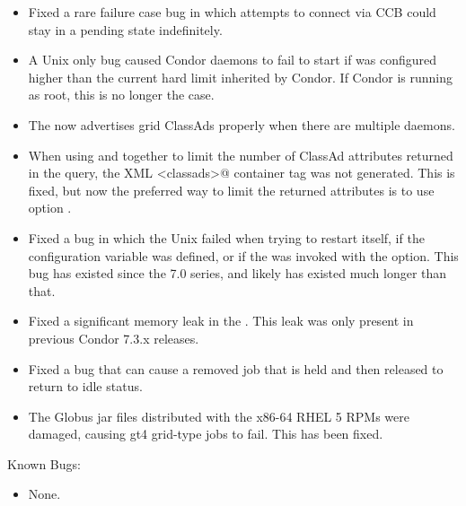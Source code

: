 \begin{itemize}
\item Fixed a rare failure case bug in which attempts to connect via
CCB could stay in a pending state indefinitely.

\item A Unix only bug caused Condor daemons to fail to start if
 was configured higher
than the current hard limit inherited by Condor.  If Condor is running
as root, this is no longer the case.

\item The  now advertises grid ClassAds properly when there
are multiple  daemons.

\item When using   and  together to
limit the number of ClassAd attributes returned in the query, the XML
\verb@<classads>@ container tag was not generated.  This is fixed, but
now the preferred way to limit the returned attributes is to
use  option .

\item Fixed a bug in which the Unix  failed
when trying to restart itself,
if the configuration variable  was defined,
or if the  was invoked with the  option.
This bug has existed since the 7.0 series,
and likely has existed much longer than that.

\item Fixed a significant memory leak in the . This
leak was only present in previous Condor 7.3.x releases.

\item Fixed a bug that can cause a removed job that is held and then
released to return to idle status.

\item The Globus jar files distributed with the x86-64 RHEL 5 RPMs were
damaged, causing gt4 grid-type jobs to fail. This has been fixed.

\end{itemize}

\noindent Known Bugs:

\begin{itemize}

\item None.

\end{itemize}

